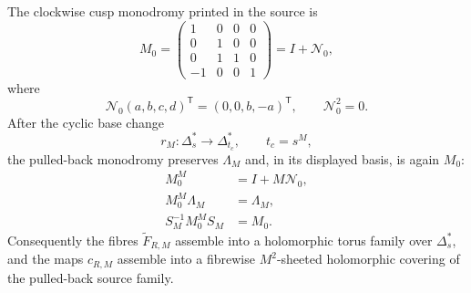 \begin{theorem}
The clockwise cusp monodromy printed in the source is
\begin{equation}\label{eq:s6cusp-source-monodromy}
 M_0=
 \begin{pmatrix}
 1&0&0&0\\
 0&1&0&0\\
 0&1&1&0\\
 -1&0&0&1
 \end{pmatrix}
 =I+\mathcal N_0,
\end{equation}
where
\begin{equation}\label{eq:s6cusp-source-nilpotent}
 \mathcal N_0(a,b,c,d)^{\mathsf T}
 =(0,0,b,-a)^{\mathsf T},
 \qquad
 \mathcal N_0^2=0.
\end{equation}
After the cyclic base change
\begin{equation}\label{eq:s6cusp-cover-base-change}
 r_M:\Delta_s^*\longrightarrow\Delta_{t_c}^*,
 \qquad t_c=s^M,
\end{equation}
the pulled-back monodromy preserves \(\Lambda_M\) and, in its displayed
basis, is again \(M_0\):
\begin{align}
 M_0^M&=I+M\mathcal N_0,
 \label{eq:s6cusp-monodromy-power}\\
 M_0^M\Lambda_M&=\Lambda_M,
 \label{eq:s6cusp-monodromy-preserves-sublattice}\\
 S_M^{-1}M_0^MS_M&=M_0.
 \label{eq:s6cusp-monodromy-conjugacy}
\end{align}
Consequently the fibres \(\widetilde F_{R,M}\) assemble into a holomorphic
torus family over \(\Delta_s^*\), and the maps \(c_{R,M}\) assemble into a
fibrewise \(M^2\)-sheeted holomorphic covering of the pulled-back source
family.
\end{theorem}

